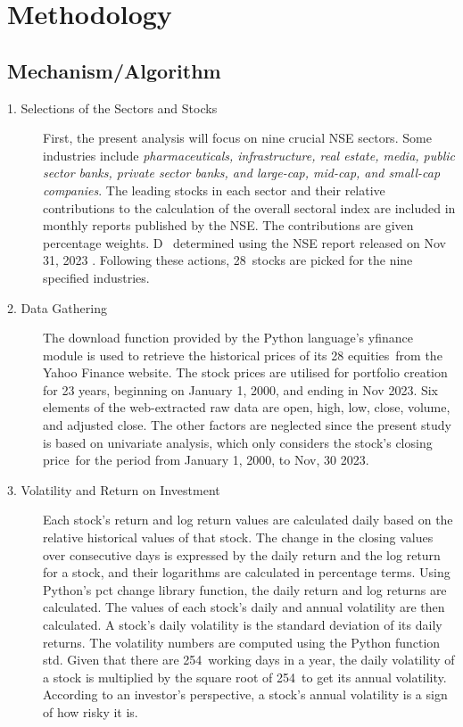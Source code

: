 \chapter{Methodology}
\section{Mechanism/Algorithm}
\begin{description}
   \item[1. Selections of the Sectors and Stocks] First, the present analysis will focus on nine crucial NSE sectors. Some industries include \emph{pharmaceuticals, infrastructure, real estate, media, public sector banks, private sector banks, and large-cap, mid-cap, and small-cap companies}. The leading stocks in each sector and their relative contributions to the calculation of the overall sectoral index are included in monthly reports published by the NSE.
The contributions are given percentage weights. D  determined using the NSE report released on Nov 31, 2023 \cite{NSEJune2022}. Following these actions, 28 stocks are picked for the nine specified industries.
   \item[2. Data Gathering] The download function provided by the Python language's yfinance module is used to retrieve the historical prices of its 28 equities from the Yahoo Finance website. The stock prices are utilised for portfolio creation for 23 years, beginning on January 1, 2000, and ending in Nov 2023. Six elements of the web-extracted raw data are open, high, low, close, volume, and adjusted close. The other factors are neglected since the present study is based on univariate analysis, which only considers the stock's closing price for the period from January 1, 2000, to Nov, 30 2023.
   \item[3. Volatility and Return on Investment] Each stock's return and log return values are calculated daily based on the relative historical values of that stock. The change in the closing values over consecutive days is expressed by the daily return and the log return for a stock, and their logarithms are calculated in percentage terms. Using Python's pct change library function, the daily return and log returns are calculated. The values of each stock's daily and annual volatility are then calculated. A stock's daily volatility is the standard deviation of its daily returns. The volatility numbers are computed using the Python function std. Given that there are 254 working days in a year, the daily volatility of a stock is multiplied by the square root of 254 to get its annual volatility. According to an investor's perspective, a stock's annual volatility is a sign of how risky it is.

\end{description}
